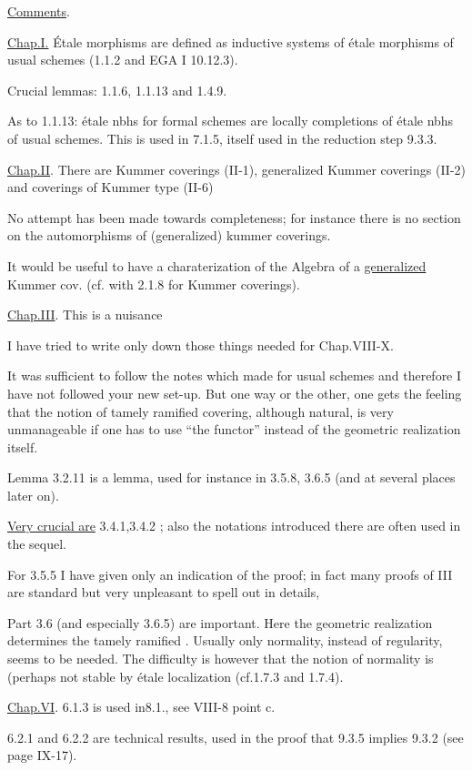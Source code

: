 
\uline{Comments}.

\uline{Chap.I.} \'{E}tale morphisms are defined as inductive systems of étale morphisms of usual schemes (1.1.2 and EGA I 10.12.3).

Crucial lemmas: 1.1.6, 1.1.13 and 1.4.9.

As to 1.1.13: étale nbhs for formal schemes are locally completions of étale nbhs of usual schemes. This is used in 7.1.5, itself used in the reduction step 9.3.3.

\uline{Chap.II}. There are Kummer coverings (II-1), generalized Kummer coverings (II-2) and coverings of Kummer type (II-6)\handwritten{!}

No attempt has been made towards completeness; for instance there is no section on the automorphisms of (generalized) kummer coverings.

It would be useful to have a charaterization of the Algebra of a \uline{generalized} Kummer cov. (cf. with 2.1.8 for Kummer coverings).

\uline{Chap.III}. This is a nuisance\handwritten{!}

I have tried to write only down those things needed for Chap.VIII-X.

It was sufficient to follow the notes which  made for usual schemes and therefore I have not followed your new set-up. But one way or the other, one gets the feeling that the notion of tamely ramified covering, although natural, is very unmanageable if one has to use ``the functor'' instead of the geometric realization itself.

Lemma 3.2.11 is a  lemma, used for instance in 3.5.8, 3.6.5 (and  at several places later on).

\uline{Very crucial are}  3.4.1,3.4.2 ; also the notations introduced there are often used in the sequel.

For 3.5.5 I have given only an indication of the proof; in fact many proofs of III are standard but very unpleasant to spell out in  details,

Part 3.6 (and especially 3.6.5) are important. Here the geometric realization determines the tamely ramified . Usually only normality, instead of regularity, seems to be needed. The difficulty is however that the notion of normality is (perhaps not stable by étale localization (cf.1.7.3 and 1.7.4).

\uline{Chap.VI}.  6.1.3 is used in8.1., see VIII-8 point c.

6.2.1 and 6.2.2 are technical results, used in the proof that 9.3.5 implies 9.3.2 (see  page IX-17).

